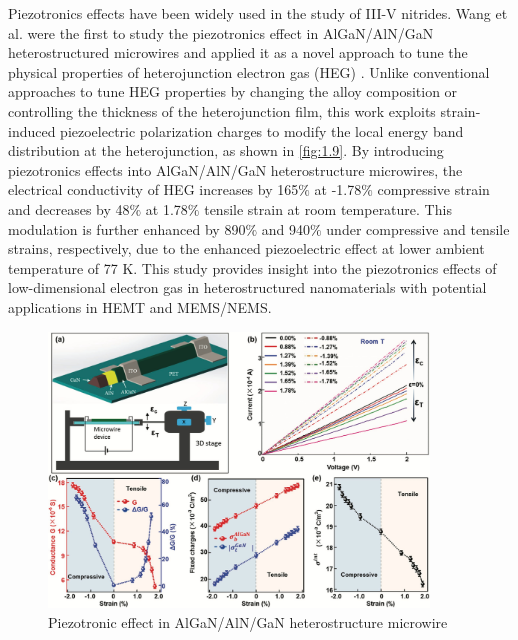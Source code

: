 Piezotronics  effects have been widely used in the study of III-V  nitrides. Wang et al. were the first to study the piezotronics effect in AlGaN/AlN/GaN heterostructured  microwires and applied it as a novel approach to tune the physical properties of  heterojunction electron gas (HEG) \cite{wang2016piezotronic}. Unlike conventional approaches to tune HEG properties by changing the alloy composition or controlling the thickness of the heterojunction film, this work exploits  strain-induced piezoelectric polarization charges  to modify the local energy band  distribution at the heterojunction, as shown in \autoref{fig:1.9}. By introducing piezotronics  effects into AlGaN/AlN/GaN heterostructure microwires, the electrical conductivity  of  HEG increases by 165$\%$ at -1.78$\%$ compressive strain and decreases by 48$\%$ at 1.78$\%$ tensile strain at room temperature. This modulation  is further enhanced by 890$\%$ and 940$\%$ under compressive and tensile strains, respectively, due to the enhanced piezoelectric effect  at lower ambient temperature of 77 \unit{\kelvin}. This study provides insight into the piezotronics  effects of low-dimensional electron gas in heterostructured nanomaterials with potential applications in HEMT  and  MEMS/NEMS.

\begin{figure}[H] 
\centering    
\includegraphics[width=0.9\textwidth]{ch1_9}
\caption[Piezotronic effect in AlGaN/AlN/GaN heterostructure microwire]{Piezotronic effect in AlGaN/AlN/GaN heterostructure microwire \protect\cite{wang2016piezotronic}}
\label{fig:1.9}
\end{figure}

